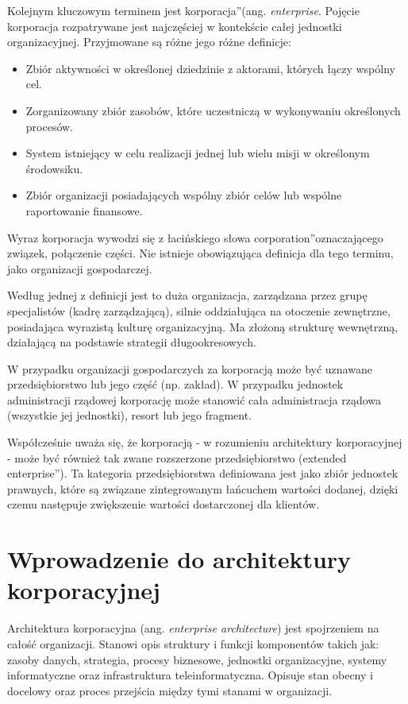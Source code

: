 Kolejnym kluczowym terminem jest \quotedblbase korporacja\textquotedblright (ang. \textit{enterprise}. Pojęcie korporacja rozpatrywane jest najczęściej w kontekście całej jednostki organizacyjnej. Przyjmowane są różne jego różne definicje:
\begin{itemize}
\item{Zbiór aktywności w określonej dziedzinie z aktorami, których łączy wspólny cel.}
\item{Zorganizowany zbiór zasobów, które uczestniczą w wykonywaniu określonych procesów.}
\item{System istniejący w celu realizacji jednej lub wielu misji w określonym środowsiku.}
\item{Zbiór organizacji posiadających wspólny zbiór celów lub wspólne raportowanie finansowe.}
\end{itemize}

Wyraz korporacja wywodzi się z łacińskiego słowa \quotedblbase corporation\textquotedblright oznaczającego związek, połączenie części. Nie istnieje obowiązująca definicja dla tego terminu, jako organizacji gospodarczej. 

Według jednej z definicji jest to duża organizacja, zarządzana przez grupę specjalistów (kadrę zarządzającą), silnie oddziałująca na otoczenie zewnętrzne, posiadająca wyrazistą kulturę organizacyjną. Ma złożoną strukturę wewnętrzną, działającą na podstawie strategii długookresowych.

W przypadku organizacji gospodarczych za korporacją może być uznawane przedsiębiorstwo lub jego część (np. zakład). W przypadku jednostek administracji rządowej korporację może stanowić cała administracja rządowa (wszystkie jej jednostki), resort lub jego fragment.

Współcześnie uważa się, że korporacją - w rozumieniu architektury korporacyjnej - może być również tak zwane rozszerzone przedsiębiorstwo (\quotedblbase extended enterprise\textquotedblright). Ta kategoria przedsiębiorstwa definiowana jest jako zbiór jednostek prawnych, które są związane zintegrowanym łańcuchem wartości dodanej, dzięki czemu następuje zwiększenie wartości dostarczonej dla klientów.\cite{SobArchKorpDobrPr} 

\section{Wprowadzenie do architektury korporacyjnej}
Architektura korporacyjna (ang. \emph{enterprise architecture}) jest spojrzeniem na całość organizacji. Stanowi opis struktury i funkcji komponentów takich jak: zasoby danych, strategia, procesy biznesowe, jednostki organizacyjne, systemy informatyczne oraz infrastruktura teleinformatyczna. Opisuje stan obecny i docelowy oraz proces przejścia między tymi stanami w organizacji.\cite{ArchKorpSob}

